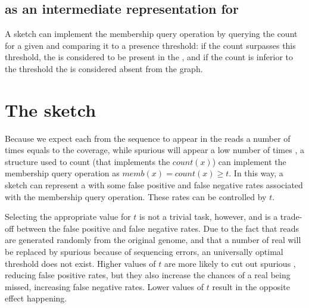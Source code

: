 \subsection{\cm as an intermediate representation for }

A \cm sketch can implement the membership query operation by querying the count for a given \kmer and comparing it to a presence threshold:
if the count surpasses this threshold, the \kmer is considered to be present in the \dBG, and if the count is inferior to the threshold the
\kmer is considered absent from the graph.

\section{The \dB\cm sketch}
\label{sec:debruijncountmin}


Because we expect each \kmer from the sequence to appear in the reads a number of times equals to the coverage, while spurious  will appear a low number of times \cite{Conway2011} \cite{Ghosh2019}, a structure used to count  (that implements the $\mathit{count}(x)$) can implement the membership query operation as $\mathit{memb}(x)=\mathit{count}(x) \geq t$. In this way, a \cm sketch can  represent a \dBG with some false positive and false negative rates associated with the membership query operation. These rates can be controlled by $t$.

Selecting the appropriate value for $t$ is not a trivial task, however, and is a trade-off between the false positive and false negative rates. Due to the fact that reads are generated randomly from the original genome, and that a number of real  will be replaced by spurious  because of sequencing errors, an universally optimal threshold  does not exist. Higher values of $t$ are more likely to cut out spurious , reducing false positive rates, but they also increase the chances of a real \kmer being missed, increasing false negative rates. Lower values of $t$ result in the opposite effect happening.

